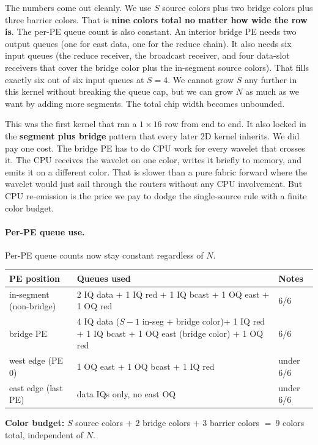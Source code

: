 \documentclass[11pt]{article}
\begin{document}
The numbers come out cleanly. We use $S$ source colors plus
two bridge colors plus three barrier colors. That is
\textbf{nine colors total no matter how wide the row is}.
The per-PE queue count is also constant. An interior bridge
PE needs two output queues (one for east data, one for the
reduce chain). It also needs six input queues (the reduce
receiver, the broadcast receiver, and four data-slot
receivers that cover the bridge color plus the in-segment
source colors). That fills exactly six out of six input queues
at $S = 4$. We cannot grow $S$ any further in this kernel
without breaking the queue cap, but we can grow $N$ as much
as we want by adding more segments. The total chip width
becomes unbounded.

This was the first kernel that ran a $1 \times 16$ row from
end to end. It also locked in the \textbf{segment plus
bridge} pattern that every later 2D kernel inherits. We did
pay one cost. The bridge PE has to do CPU work for every
wavelet that crosses it. The CPU receives the wavelet on one
color, writes it briefly to memory, and emits it on a
different color. That is slower than a pure fabric forward
where the wavelet would just sail through the routers without
any CPU involvement. But CPU re-emission is the price we pay
to dodge the single-source rule with a finite color budget.

\paragraph{Per-PE queue use.}
Per-PE queue counts now stay constant regardless of $N$.

\begin{center}\footnotesize
\begin{tabular}{lll}
\toprule
PE position & Queues used & Notes \\
\midrule
in-segment (non-bridge) & 2 IQ data + 1 IQ red + 1 IQ bcast + 1 OQ east + 1 OQ red & 6/6 \\
bridge PE & 4 IQ data ($S{-}1$ in-seg + bridge color)+ 1 IQ red + 1 IQ bcast + 1 OQ east (bridge color) + 1 OQ red & 6/6 \\
west edge (PE 0) & 1 OQ east + 1 OQ bcast + 1 IQ red & under 6/6 \\
east edge (last PE) & data IQs only, no east OQ & under 6/6 \\
\bottomrule
\end{tabular}
\end{center}

\textbf{Color budget:} $S$ source colors $+$ $2$ bridge colors
$+$ $3$ barrier colors $=\ 9$ colors total, independent of $N$.
\end{document}
